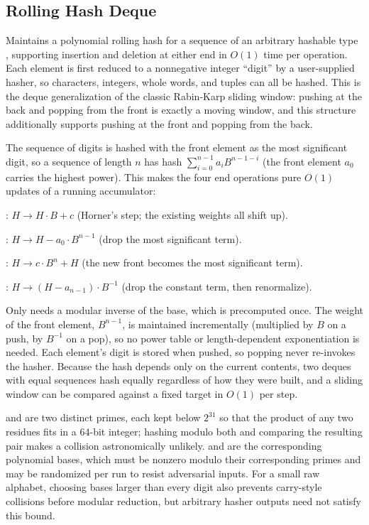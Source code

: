 \subsection{Rolling Hash Deque}
\label{sec:3.2.3}
Maintains a polynomial rolling hash for a sequence of an arbitrary hashable type , supporting insertion and deletion at either end in $O(1)$ time per operation. Each element is first reduced to a nonnegative integer ``digit'' by a user-supplied hasher, so characters, integers, whole words, and tuples can all be hashed. This is the deque generalization of the classic Rabin-Karp sliding window: pushing at the back and popping from the front is exactly a moving window, and this structure additionally supports pushing at the front and popping from the back.

The sequence of digits is hashed with the front element as the most significant digit, so a sequence of length $n$ has hash $\sum_{i=0}^{n-1} a_i B^{n-1-i}$ (the front element $a_0$ carries the highest power). This makes the four end operations pure $O(1)$ updates of a running accumulator:

\begin{compactitem}
  \item {}:  $H \to H \cdot B + c$ (Horner's step; the existing weights all shift up).
  \item {}:   $H \to H - a_0 \cdot B^{n-1}$ (drop the most significant term).
  \item {}: $H \to c \cdot B^{n} + H$ (the new front becomes the most significant term).
  \item {}:    $H \to (H - a_{n-1}) \cdot B^{-1}$ (drop the constant term, then renormalize).
\end{compactitem}

Only  needs a modular inverse of the base, which is precomputed once. The weight of the front element, $B^{n-1}$, is maintained incrementally (multiplied by $B$ on a push, by $B^{-1}$ on a pop), so no power table or length-dependent exponentiation is needed. Each element's digit is stored when pushed, so popping never re-invokes the hasher. Because the hash depends only on the current contents, two deques with equal sequences hash equally regardless of how they were built, and a sliding window can be compared against a fixed target in $O(1)$ per step.

 and  are two distinct primes, each kept below $2^{31}$ so that the product of any two residues fits in a 64-bit integer; hashing modulo both and comparing the resulting pair makes a collision astronomically unlikely.  and  are the corresponding polynomial bases, which must be nonzero modulo their corresponding primes and may be randomized per run to resist adversarial inputs. For a small raw alphabet, choosing bases larger than every digit also prevents carry-style collisions before modular reduction, but arbitrary hasher outputs need not satisfy this bound.

